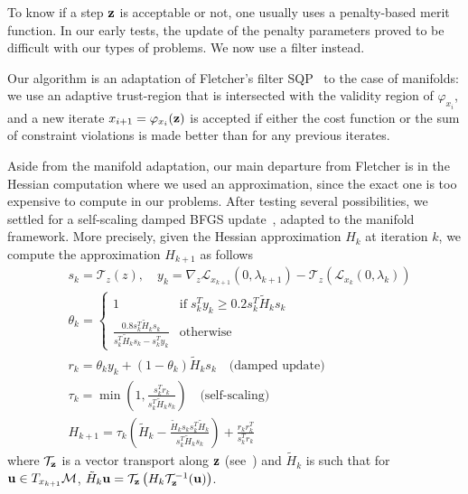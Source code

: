 To know if a step ${\bf z}$ is acceptable or not, one usually uses a penalty-based merit function. In our early tests, the update of the penalty parameters proved to be difficult with our types of problems. We now use a filter instead.

Our algorithm is an adaptation of Fletcher's filter SQP~\cite{fletcher:mathprog:2000} to the case of manifolds: we use an adaptive trust-region that is intersected with the validity region of $\varphi_{x_i}$, and a new iterate $x_{i+1} = \varphi_{x_i}({\bf z})$ is accepted if either the cost function or the sum of constraint violations is made better than for any previous iterates.

Aside from the manifold adaptation, our main departure from Fletcher is in the Hessian computation where we used an approximation, since the exact one is too expensive to compute in our problems. After testing several possibilities, we settled for a self-scaling damped BFGS update~\cite{nocedal:mp:1993,nocedal:book:2006}, adapted to the manifold framework. More precisely, given the Hessian approximation $H_k$ at iteration $k$, we compute the approximation $H_{k+1}$ as follows
\begin{align}
	&s_k = \mathcal{T}_z(z), \quad y_k = \nabla_z \mathcal{L}_{x_{k+1}}(0,\lambda_{k+1}) - \mathcal{T}_z(\mathcal{L}_{x_{k}}(0,\lambda_{k})) \nonumber\\
	&\theta_k = \left\{\begin{array}{ll}
		1 & \mbox{if} \; s_k^T y_k \geq 0.2 s_k^T \tilde{H}_k s_k \\
		\frac{0.8 s_k^T \tilde{H}_k s_k}{s_k^T \tilde{H}_k s_k - s_k^T y_k} & \mbox{otherwise}
	\end{array}\right. \nonumber \\
	&r_k = \theta_k y_k + \left(1-\theta_k\right) \tilde{H}_k s_k \quad \mbox{(damped update)} \nonumber \\
	&\tau_k = \min\left(1, \frac{s_k^T r_k}{s_k^T \tilde{H}_k s_k} \right) \quad \mbox{(self-scaling)} \nonumber \\
	&H_{k+1} = \tau_k \left(\tilde{H}_k - \frac{\tilde{H}_k s_k s_k^T \tilde{H}_k}{s_k^T \tilde{H}_k s_k} \right) + \frac{r_k r_k^T}{s_k^T r_k} \nonumber
\end{align}
where $\mathcal{T}_{\bf z}$ is a vector transport along ${\bf z}$ (see~\cite{absil:book:2008}) and $\tilde{H}_k$ is such that for ${\bf u} \in T_{x_{k+1}} \mathcal{M}$, $\tilde{H}_k {\bf u} = \mathcal{T}_{\bf z}\left(H_k \mathcal{T}_{\bf z}^{-1}({\bf u}) \right)$.


